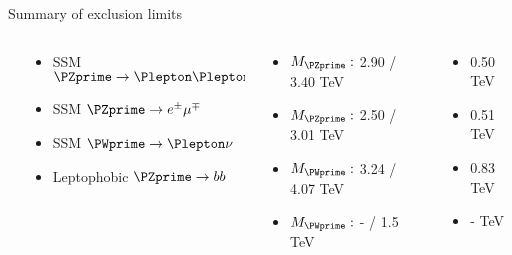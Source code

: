 \documentclass[8pt]{beamer}
\begin{document}
\begin{frame}{\large Summary of exclusion limits}
  \begin{columns}
  \begin{column}{3cm}
  \end{column}
  \begin{column}{3cm}
    \begin{itemize}
     \item[\EightAsterisk] SSM $\PZprime \to \Plepton\Plepton$
     \item[\EightAsterisk] SSM $\PZprime \to e^{\pm}\mu^{\mp}$
     \item[\EightAsterisk] SSM $\PWprime \to \Plepton\nu$
     \item[\EightAsterisk] Leptophobic $\PZprime \to bb$
    \end{itemize}
  \end{column}
  \begin{column}{3.3cm}
    \begin{itemize}
     \item[] $M_{\PZprime}:$ 2.90 / 3.40 TeV
     \item[] $M_{\PZprime}:$ 2.50 / 3.01 TeV
     \item[] $M_{\PWprime}:$ 3.24 / 4.07 TeV
     \item[] $M_{\PWprime}:$ -    / 1.5 TeV
    \end{itemize}
  \end{column}
  \begin{column}{2.7cm}
    \begin{itemize}
     \item[] 0.50 TeV
     \vspace{0.09cm}
     \item[] 0.51 TeV
     \vspace{0.09cm}
     \item[] 0.83 TeV
     \vspace{0.09cm}
     \item[] - TeV
    \end{itemize}
  \end{column}
 \end{columns}
 
 \vspace{0.2cm}
 

\end{frame}
\end{document}
